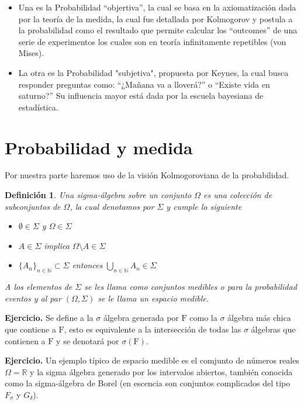 \documentclass[letterpaper]{book}
\newtheorem{def.}{Definici\'on}[section]
\newcommand{\nat}{\ensuremath{ \mathbb N }}
\newcommand{\eje}{{\newline \noindent \sc \textbf{Ejercicio. }}}
\newcommand{\re}{\ensuremath{\mathbb R }}
\begin{document}
\begin{itemize}
\item Una es la Probabilidad ``objertiva'', la cual se basa en la axiomatización dada por la teoría de la medida, la cual fue detallada por Kolmogorov y postula a la probabilidad como el resultado que permite calcular los ``outcomes'' de una serie de experimentos los cuales son en teoría infinitamente repetibles (von Mises).

\item La otra es la Probabilidad "subjetiva", propuesta por Keynes, la cual busca responder preguntas como: ``¿Mañana va a lloverá?'' o ``Existe vida en saturno?'' Su influencia mayor está dada por la escuela bayesiana de estadística.
\end{itemize}
\section{Probabilidad y medida}
\label{sec:org8e8e3ed}
\noindent Por nuestra parte haremos uso de la visión Kolmogoroviana de la probabilidad.
\begin{def.}
Una \emph{sigma-álgebra} sobre un conjunto \(\Omega\) es una colección de subconjuntos de \(\Omega\), la cual denotamos por \(\Sigma\) y cumple lo siguiente
\begin{itemize}
\item \(\emptyset\in\Sigma\) y \(\Omega\in\Sigma\)
\item \(A\in\Sigma\) implica \(\Omega\setminus A\in\Sigma\)
\item \(\{A_n\}_{n\in\nat}\subset\Sigma\) entonces \(\bigcup_{n\in\nat} A_n\in\Sigma\)
\end{itemize}
A los elementos de \(\Sigma\) se les llama como \emph{conjuntos medibles} o para la probabilidad \emph{eventos} y al par \((\Omega,\Sigma)\) se le llama un espacio medible.
\end{def.}

\eje Se define a la \(\sigma\) álgebra generada por \(\mathrm{F}\) como la \(\sigma\) álgebra más chica que contiene a \(\mathrm{F}\), esto es equivalente a la intersección de todas las \(\sigma\) álgebras que contienen a \(\mathrm{F}\) y se denotará por \(\sigma(\mathrm{F})\).

\eje Un ejemplo típico de espacio medible es el comjunto de números reales \(\Omega=\re\) y la sigma álgebra generado por los intervalos abiertos, también conocida como la sigma-álgebra de Borel (en escencia son conjuntos complicados del tipo \(F_{\sigma}\) y \(G_{\delta}\)).
\end{document}

